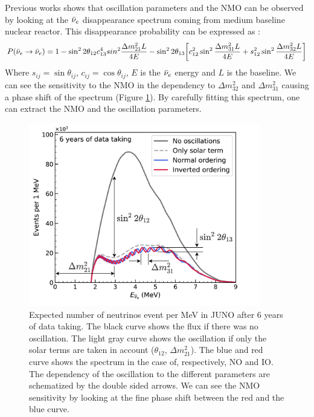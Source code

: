 Previous works \cite{zhan_determination_2008,  zhan_experimental_2009} shows that oscillation parameters and the NMO can be observed by looking at the $\bar{\nu}_{e}$ disappearance spectrum coming from medium baseline nuclear reactor. This disappearance probability can be expressed as \cite{an_neutrino_2016} :
\begin{equation*}
  P(\bar{\nu}_{e} \rightarrow \bar{\nu}_{e}) = 1 - \sin^2 2\theta_{12} c^4_{13} sin^2 \frac{\Delta m^2_{21}L}{4E} - \sin^2 2\theta_{13} \bigg[ c_{12}^2 \sin^2 \frac{\Delta m_{31}^2 L}{4E} + s^2_{12} \sin^2 \frac{\Delta m_{32}^2 L}{4E} \bigg]
\end{equation*}
Where $s_{ij} = \sin \theta_{ij}$, $c_{ij} = \cos \theta_{ij}$, $E$ is the $\bar{\nu}_{e}$ energy and $L$ is the baseline.
We can see the sensitivity to the NMO in the dependency to $\Delta m_{32}^2$ and $\Delta m^2_{31}$ causing a phase shift of the spectrum (Figure \ref{fig:juno-spectrum-oscillation}).
By carefully fitting this spectrum, one can extract the NMO and the oscillation parameters.
\begin{figure}
  \centering
  \includegraphics[height=8cm]{images/juno/Spectrum-OscillationsOnly_dm2_31.png}
  \caption{Expected number of neutrinos event per MeV in JUNO after 6 years of data taking. The black curve shows the flux if there was no oscillation. The light gray curve shows the oscillation if only the solar terms are taken in account ($\theta_{12}$, $\Delta m_{21}^2$). The blue and red curve shows the spectrum in the case of, respectively, NO and IO. The dependency of the oscillation to the different parameters are schematized by the double sided arrows. We can see the NMO sensitivity by looking at the fine phase shift between the red and the blue curve.}
  \label{fig:juno-spectrum-oscillation}
\end{figure}

